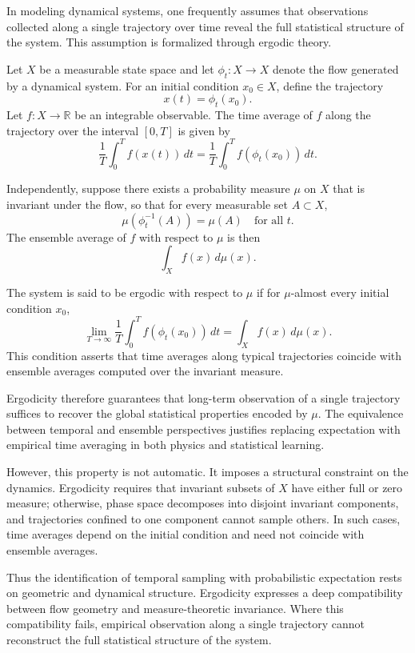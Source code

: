 \documentclass[12pt]{book}
\begin{document}
In modeling dynamical systems, one frequently assumes that observations collected along a single trajectory over time reveal the full statistical structure of the system. This assumption is formalized through ergodic theory.

Let $X$ be a measurable state space and let $\phi_t : X \to X$ denote the flow generated by a dynamical system. For an initial condition $x_0 \in X$, define the trajectory
\[
x(t) = \phi_t(x_0).
\]
Let $f : X \to \mathbb{R}$ be an integrable observable. The time average of $f$ along the trajectory over the interval $[0,T]$ is given by
\[
\frac{1}{T} \int_0^T f(x(t))\, dt
=
\frac{1}{T} \int_0^T f(\phi_t(x_0))\, dt.
\]

Independently, suppose there exists a probability measure $\mu$ on $X$ that is invariant under the flow, so that for every measurable set $A \subset X$,
\[
\mu(\phi_t^{-1}(A)) = \mu(A)
\quad \text{for all } t.
\]
The ensemble average of $f$ with respect to $\mu$ is then
\[
\int_X f(x)\, d\mu(x).
\]

The system is said to be ergodic with respect to $\mu$ if for $\mu$-almost every initial condition $x_0$,
\[
\lim_{T \to \infty}
\frac{1}{T} \int_0^T f(\phi_t(x_0))\, dt
=
\int_X f(x)\, d\mu(x).
\]
This condition asserts that time averages along typical trajectories coincide with ensemble averages computed over the invariant measure.

Ergodicity therefore guarantees that long-term observation of a single trajectory suffices to recover the global statistical properties encoded by $\mu$. The equivalence between temporal and ensemble perspectives justifies replacing expectation with empirical time averaging in both physics and statistical learning.

However, this property is not automatic. It imposes a structural constraint on the dynamics. Ergodicity requires that invariant subsets of $X$ have either full or zero measure; otherwise, phase space decomposes into disjoint invariant components, and trajectories confined to one component cannot sample others. In such cases, time averages depend on the initial condition and need not coincide with ensemble averages.

Thus the identification of temporal sampling with probabilistic expectation rests on geometric and dynamical structure. Ergodicity expresses a deep compatibility between flow geometry and measure-theoretic invariance. Where this compatibility fails, empirical observation along a single trajectory cannot reconstruct the full statistical structure of the system.
\end{document}
